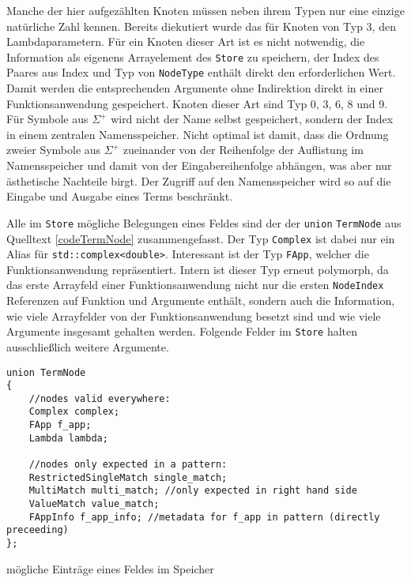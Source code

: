 Manche der hier aufgezählten Knoten müssen neben ihrem Typen nur eine einzige natürliche Zahl kennen. Bereits diekutiert wurde das für Knoten von Typ $3$, den Lambdaparametern. Für ein Knoten dieser Art ist es nicht notwendig, die Information als eigenens Arrayelement des \verb|Store| zu speichern, der Index des Paares aus Index und Typ von \verb|NodeType| enthält direkt den erforderlichen Wert. Damit werden die entsprechenden Argumente ohne Indirektion direkt in einer Funktionsanwendung gespeichert. Knoten dieser Art sind Typ 0, 3, 6, 8 und 9. Für Symbole aus $\Sigma^+$ wird nicht der Name selbst gespeichert, sondern der Index in einem zentralen Namensspeicher. Nicht optimal ist damit, dass die Ordnung zweier Symbole aus $\Sigma^+$ zueinander von der Reihenfolge der Auflistung im Namensspeicher und damit von der Eingabereihenfolge abhängen, was aber nur ästhetische Nachteile birgt. Der Zugriff auf den Namensspeicher wird so auf die Eingabe und Ausgabe eines Terms beschränkt.


Alle im \verb|Store| mögliche Belegungen eines Feldes sind der der \verb|union| \verb|TermNode| aus Quelltext \ref{codeTermNode} zusammengefasst. Der Typ \verb|Complex| ist dabei nur ein Alias für \verb|std::complex<double>|. Interessant ist der Typ \verb|FApp|, welcher die Funktionsanwendung repräsentiert. Intern ist dieser Typ erneut polymorph, da das erste Arrayfeld einer Funktionsanwendung nicht nur die ersten \verb|NodeIndex| Referenzen auf Funktion und Argumente enthält, sondern auch die Information, wie viele Arrayfelder von der Funktionsanwendung besetzt sind und wie viele Argumente insgesamt gehalten werden. Folgende Felder im \verb|Store| halten ausschließlich weitere Argumente.


\begin{listing}
\footnotesize
\begin{verbatim}
union TermNode 
{
    //nodes valid everywhere:
    Complex complex;
    FApp f_app;
    Lambda lambda;
    
    //nodes only expected in a pattern:
    RestrictedSingleMatch single_match;
    MultiMatch multi_match; //only expected in right hand side
    ValueMatch value_match;
    FAppInfo f_app_info; //metadata for f_app in pattern (directly preceeding)
};
\end{verbatim}
\label{codeTermNode}
\caption{mögliche Einträge eines Feldes im Speicher}
\end{listing}



